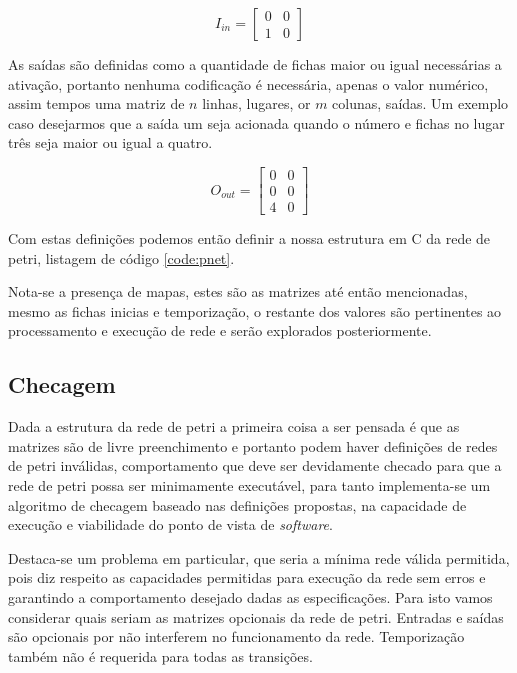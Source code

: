 $$
I_{in} = 
\begin{bmatrix}
	0 & 0\\
	1 & 0
\end{bmatrix}
$$

As saídas são definidas como a quantidade de fichas maior ou igual necessárias a ativação, portanto nenhuma codificação é necessária, apenas o valor numérico, assim tempos uma matriz de $n$ linhas, lugares, or $m$ colunas, saídas. Um exemplo caso desejarmos que a saída um seja acionada quando o número e fichas no lugar três seja maior ou igual a quatro.

$$
O_{out} = 
\begin{bmatrix}
	0 & 0\\
	0 & 0\\
	4 & 0
\end{bmatrix}
$$

Com estas definições podemos então definir a nossa estrutura em C da rede de petri, listagem de código \ref{code:pnet}.



Nota-se a presença de mapas, estes são as matrizes até então mencionadas, mesmo as fichas inicias e temporização, o restante dos valores são pertinentes ao processamento e execução de rede e serão explorados posteriormente. 

\subsection{Checagem}

Dada a estrutura da rede de petri a primeira coisa a ser pensada é que as matrizes são de livre preenchimento e portanto podem haver definições de redes de petri inválidas, comportamento que deve ser devidamente checado para que a rede de petri possa ser minimamente executável, para tanto implementa-se um algoritmo de checagem baseado nas definições propostas, na capacidade de execução e viabilidade do ponto de vista de \textit{software}.

Destaca-se um problema em particular, que seria a mínima rede válida permitida, pois diz respeito as capacidades permitidas para execução da rede sem erros e garantindo a comportamento desejado dadas as especificações. Para isto vamos considerar quais seriam as matrizes opcionais da rede de petri. Entradas e saídas são opcionais por não interferem no funcionamento da rede. Temporização também não é requerida para todas as transições. 

